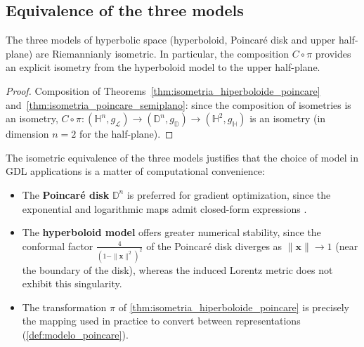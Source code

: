 \subsection{Equivalence of the three models}\label{subsec:equivalencia_modelos}

\begin{corollary}\label{cor:equivalencia_modelos_hiperbolicos}
The three models of hyperbolic space (hyperboloid, Poincaré disk and upper half-plane) are Riemannianly isometric. In particular, the composition $C \circ \pi$ provides an explicit isometry from the hyperboloid model to the upper half-plane.
\end{corollary}

\begin{proof}
Composition of Theorems~\ref{thm:isometria_hiperboloide_poincare} and~\ref{thm:isometria_poincare_semiplano}: since the composition of isometries is an isometry, $C \circ \pi: (\mathbb{H}^n, g_{\mathcal{L}}) \to (\mathbb{D}^n, g_{\mathbb{D}}) \to (\mathbb{H}^2, g_{\mathbb{H}})$ is an isometry (in dimension $n = 2$ for the half-plane).
\end{proof}

\begin{remark}\label{rem:modelos_gdl}
The isometric equivalence of the three models justifies that the choice of model in GDL applications is a matter of computational convenience:
\begin{itemize}
    \item The \textbf{Poincaré disk} $\mathbb{D}^n$ is preferred for gradient optimization, since the exponential and logarithmic maps admit closed-form expressions \citep{nickel2017poincare}.
    \item The \textbf{hyperboloid model} offers greater numerical stability, since the conformal factor $\frac{4}{(1-\|\mathbf{x}\|^2)^2}$ of the Poincaré disk diverges as $\|\mathbf{x}\| \to 1$ (near the boundary of the disk), whereas the induced Lorentz metric does not exhibit this singularity.
    \item The transformation $\pi$ of \autoref{thm:isometria_hiperboloide_poincare} is precisely the mapping used in practice to convert between representations (\autoref{def:modelo_poincare}).
\end{itemize}
\end{remark}

